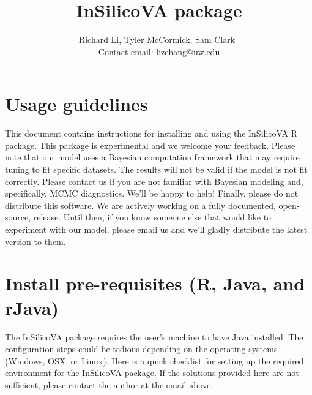 \documentclass{article}\usepackage[]{graphicx}\usepackage[]{color}
\begin{document}
\title{InSilicoVA package}


\author{Richard Li, Tyler McCormick, Sam Clark~\\ Contact email: lizehang@uw.edu}

\maketitle

\section*{Usage guidelines}
This document contains instructions for installing and using the InSilicoVA R package.  This package is experimental and we welcome your feedback.  Please note that our model uses a Bayesian computation framework that may require tuning to fit specific datasets.  The results will not be valid if the model is not fit correctly.  Please contact us if you are not familiar with Bayesian modeling and, specifically, MCMC diagnostics.  We'll be happy to help!  Finally, please do not distribute this software.  We are actively working on a fully documented, open-source, release.  Until then, if you know someone else that would like to experiment with our model, please email us and we'll gladly distribute the latest version to them.  

\section{Install pre-requisites (R, Java, and rJava)}
The InSilicoVA package requires the user's machine to have Java installed. The configuration steps could be tedious depending on the operating systems (Windows, OSX, or Linux). Here is a quick checklist for setting up the required environment for the InSilicoVA package.
If the solutions provided here are not sufficient, please contact the author at the email above.
\end{document}
